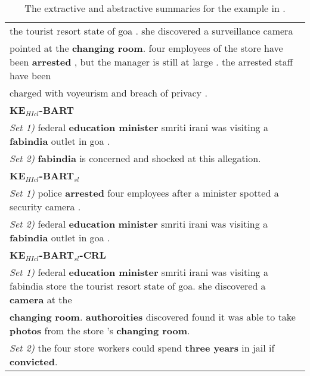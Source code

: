 \begin{table*}[th]
\begin{center}
{\begin{tabular}{|l|}
 				the tourist resort state of goa . she discovered a surveillance camera\\
 				pointed at the \textbf{changing room}. four employees of the store have been
 				\textbf{arrested} , but the manager is still at large . the arrested staff have been\\
 				charged with voyeurism and breach of privacy . \\
 				\hline \bf KE$_{HIcl}$-BART\\
 				\hline \textit{Set 1)}  federal \textbf{education minister} smriti irani was visiting a  \textbf{fabindia} outlet in goa .\\
 				\textit{Set 2)} \textbf{fabindia} is concerned and shocked at this allegation. \\
 				\hline \bf KE$_{HIcl}$-BART$_{sl}$\\
 				\hline \textit{Set 1)} police \textbf{arrested} four employees after a minister spotted a security camera .\\
 				\textit{Set 2)} federal \textbf{education} \textbf{minister} smriti irani was visiting a  \textbf{fabindia} outlet in goa . \\
 				\hline \bf KE$_{HIcl}$-BART$_{sl}$-CRL\\
 				\hline
 				\textit{Set 1)} federal \textbf{education minister} smriti irani was visiting a fabindia store 
 				the tourist resort state of goa. she discovered a \textbf{camera} at the\\ \textbf{changing} \textbf{room}.
 				\textbf{authoroities} discovered found it was able to take
 				\textbf{photos} from the store 's  \textbf{changing room}. \\
 				\textit{Set 2)} the four store workers could spend \textbf{three years} in jail if \textbf{convicted}. \\
 				\hline
 			\end{tabular}
 		}
 	\end{center}
 	\caption{The extractive and abstractive summaries for the example in .}
 	\label{tab:refextabs}  
 \end{table*}
 

